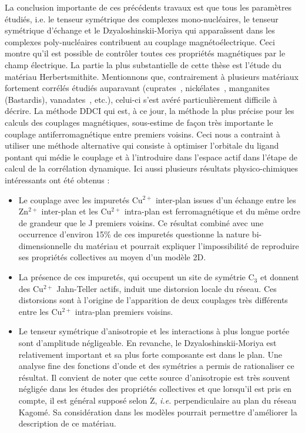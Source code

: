 \documentclass[12pt,a4paper]{report}
\numberwithin{equation}{section}
\begin{document}
La conclusion importante de ces précédents travaux est que tous les paramètres étudiés, i.e. le tenseur symétrique des complexes mono-nucléaires, le tenseur symétrique d’échange et le Dzyaloshinskii-Moriya qui apparaîssent dans les complexes poly-nucléaires contribuent au couplage magnétoélectrique. Ceci montre qu’il est possible de contrôler toutes ces propriétés magnétiques par le champ électrique. 
La partie la plus substantielle de cette thèse est l’étude du matériau Herbertsmithite. Mentionnons que, contrairement à plusieurs matériaux fortement corrélés étudiés auparavant (cuprates~\cite{calzado_proposal_2001}, nickélates~\cite{bastardis_microscopic_2007}, manganites (Bastardis), vanadates~\cite{suaud_ab_2000}, etc.), celui-ci s’est avéré particulièrement difficile à décrire. La méthode DDCI qui est, à ce jour, la méthode la plus précise pour les calculs des couplages magnétiques, sous-estime de façon très importante le couplage antiferromagnétique entre premiers voisins. Ceci nous a contraint à utiliser une méthode alternative qui consiste à optimiser l’orbitale du ligand pontant qui médie le couplage et à l’introduire dans l’espace actif dans l’étape de calcul de la corrélation dynamique. Ici aussi plusieurs résultats physico-chimiques intéressants ont été obtenus :
\begin{itemize}
\item Le couplage avec les impuretés Cu$^{2+}$ inter-plan issues d’un échange entre les Zn$^{2+}$ inter-plan et les Cu$^{2+}$ intra-plan est ferromagnétique et du même ordre de grandeur que le J premiers voisins. Ce résultat combiné avec une occurrence d’environ 15\% de ces impuretés questionne la nature bi-dimensionnelle du matériau et pourrait expliquer l’impossibilité de reproduire ses propriétés collectives au moyen d’un modèle 2D.
\item La présence de ces impuretés, qui occupent un site de symétrie C$_3$ et donnent des Cu$^{2+}$ Jahn-Teller actifs, induit une distorsion locale du réseau. Ces distorsions sont à l’origine de l’apparition de deux couplages très différents entre les Cu$^{2+}$ intra-plan premiers voisins.
\item Le tenseur symétrique d’anisotropie et les interactions à plus longue portée sont d’amplitude négligeable. En revanche, le Dzyaloshinskii-Moriya est relativement important et sa plus forte composante est dans le plan. Une analyse fine des fonctions d’onde et des symétries a permis de rationaliser ce résultat. Il convient de noter que cette source d’anisotropie est très souvent négligée dans les études des propriétés collectives et que lorsqu’il est pris en compte, il est général supposé selon Z, \textit{i.e.} perpendiculaire au plan du réseau Kagomé. Sa considération dans les modèles pourrait permettre d’améliorer la description de ce matériau. 
\end{itemize}
\end{document}

